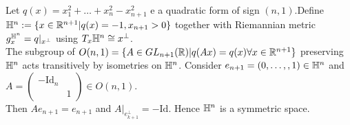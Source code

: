 \documentclass[10pt,a4paper]{article}
\begin{document}
\begin{example}
Let $q(x) = x_1^2+\ldots + x_n^2-x_{n+1}^2$ e a quadratic form of sign $(n,1)$.Define $\mathbb{H}^n:=\{x\in \mathbb{R}^{n+1}\vert q(x) = -1, x_{n+1}>0\}$ together with Riemannian metric $g_x^{\mathbb{H}^n} = q\vert_{x^\perp}$ using $T_x \mathbb{H}^n\cong x^\perp$.\\
The subgroup of $O(n,1)=\{A\in GL_{n+1}(\mathbb{R})\vert q(Ax) = q(x) \forall x\in \mathbb{R}^{n+1}\}$ preserving $\mathbb{H}^n$ acts transitively by isometries on $\mathbb{H}^n$. Consider $e_{n+1} = (0,\ldots, ,1)\in \mathbb{H}^n$ and $A = \begin{pmatrix}
-\text{Id}_n & \\
& 1
\end{pmatrix}\in O(n,1)$.\\
Then $Ae_{n+1} = e_{n+1}$ and $A\vert_{e_{k+1}^\perp} = -\text{Id}$. Hence $\mathbb{H}^n$ is a symmetric space.
\end{example}
\end{document}
